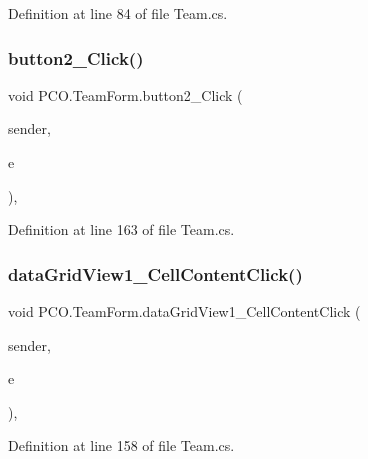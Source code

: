 Definition at line 84 of file Team.\+cs.

\mbox{\label{classPCO_1_1TeamForm_a9b390ea8ac6520eb2f875f77bcb1e139}} 
\subsubsection{\texorpdfstring{button2\+\_\+\+Click()}{button2\_Click()}}
{\footnotesize\ttfamily void P\+C\+O.\+Team\+Form.\+button2\+\_\+\+Click (\begin{DoxyParamCaption}\item[{object}]{sender,  }\item[{Event\+Args}]{e }\end{DoxyParamCaption})\hspace{0.3cm}{\ttfamily [inline]}, {\ttfamily [private]}}



Definition at line 163 of file Team.\+cs.

\mbox{\label{classPCO_1_1TeamForm_a8909ba541f3716ee9658a65347d2e3ec}} 
\subsubsection{\texorpdfstring{data\+Grid\+View1\+\_\+\+Cell\+Content\+Click()}{dataGridView1\_CellContentClick()}}
{\footnotesize\ttfamily void P\+C\+O.\+Team\+Form.\+data\+Grid\+View1\+\_\+\+Cell\+Content\+Click (\begin{DoxyParamCaption}\item[{object}]{sender,  }\item[{Data\+Grid\+View\+Cell\+Event\+Args}]{e }\end{DoxyParamCaption})\hspace{0.3cm}{\ttfamily [inline]}, {\ttfamily [private]}}



Definition at line 158 of file Team.\+cs.

